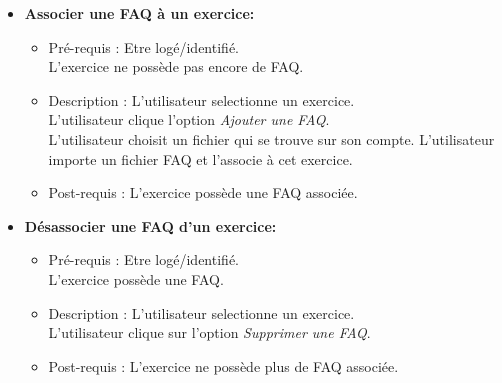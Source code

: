 \begin{itemize}
\item {\bf Associer une FAQ {\`a} un exercice:}
	\begin{itemize}
	\item Pr{\'e}-requis : Etre log{\'e}/identifi{\'e}.\\
	L'exercice ne poss{\`e}de pas encore de FAQ.
	\item Description :  L'utilisateur selectionne un exercice.\\
	L'utilisateur clique l'option {\it Ajouter une FAQ}.\\
	L'utilisateur choisit un fichier qui se trouve sur son compte.
	L'utilisateur importe un fichier FAQ et l'associe {\`a} cet exercice.
	\item Post-requis : L'exercice poss{\`e}de une FAQ associ{\'e}e.
	\end{itemize}

\item {\bf D{\'e}sassocier une FAQ d'un exercice:}
	\begin{itemize}
	\item Pr{\'e}-requis : Etre log{\'e}/identifi{\'e}.\\
	L'exercice poss{\`e}de une FAQ.
	\item Description :  L'utilisateur selectionne un exercice.\\
	L'utilisateur clique sur l'option {\it Supprimer une FAQ}.
	\item Post-requis : L'exercice ne poss{\`e}de plus de FAQ associ{\'e}e.\\
	\end{itemize}
\end{itemize}


